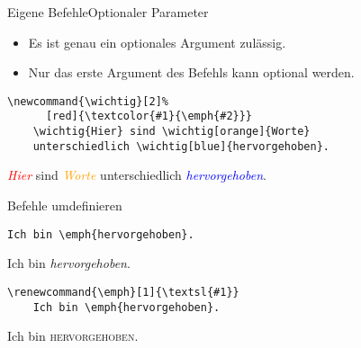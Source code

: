 \begin{Frame}[fragile]{Eigene Befehle}{Optionaler Parameter}
  \begin{itemize}
    \item Es ist \alert{genau ein} optionales Argument zulässig.
    \item Nur das \alert{erste Argument} des Befehls kann optional werden.
  \end{itemize}

  \xxx

  \begin{lstlisting}[gobble=4,moretexcs={wichtig}]
    \newcommand{\wichtig}[2]%
      [red]{\textcolor{#1}{\emph{#2}}}
    \wichtig{Hier} sind \wichtig[orange]{Worte}
    unterschiedlich \wichtig[blue]{hervorgehoben}.
  \end{lstlisting}
  \newcommand{\wichtig}[2]%
    [red]{\textcolor{#1}{\emph{#2}}}
  \wichtig{Hier} sind \wichtig[orange]{Worte}
  unterschiedlich \wichtig[blue]{hervorgehoben}.
\end{Frame}

\begin{Frame}[fragile]{Befehle umdefinieren}
  \begin{lstlisting}[gobble=4]
    Ich bin \emph{hervorgehoben}.
  \end{lstlisting}
  Ich bin \emph{hervorgehoben}.

  \xxx

  \begin{lstlisting}[gobble=4]
    \renewcommand{\emph}[1]{\textsl{#1}}
    Ich bin \emph{hervorgehoben}.
  \end{lstlisting}
  \renewcommand{\emph}[1]{\textsc{#1}}
  Ich bin \emph{hervorgehoben}.
\end{Frame}

